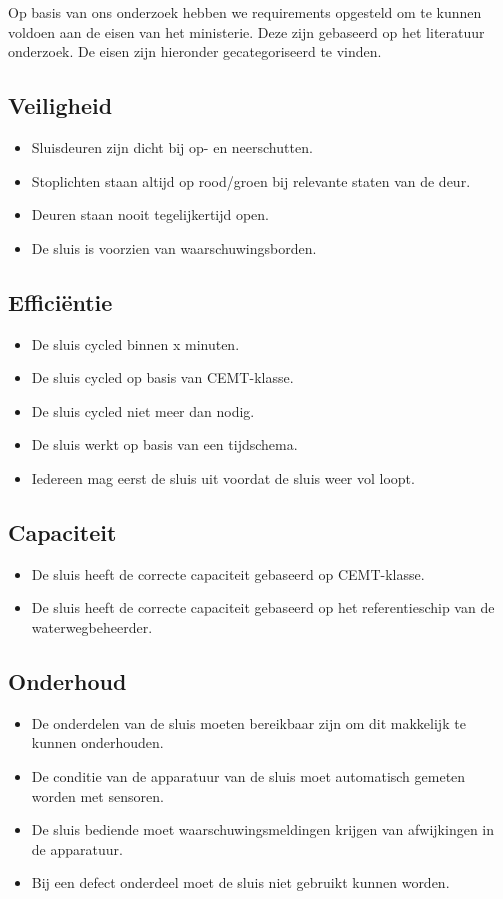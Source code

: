 \documentclass[../verslag.tex]{subfiles}
\begin{document}
Op basis van ons onderzoek hebben we requirements opgesteld om te kunnen voldoen aan de eisen van het ministerie. Deze zijn gebaseerd op het literatuur onderzoek. De eisen zijn hieronder gecategoriseerd te vinden.

\subsection{Veiligheid}
\begin{itemize}
    \item Sluisdeuren zijn dicht bij op- en neerschutten.
    \item Stoplichten staan altijd op rood/groen bij relevante staten van de deur.
    \item Deuren staan nooit tegelijkertijd open.
    \item De sluis is voorzien van waarschuwingsborden.
\end{itemize}

\subsection{Efficiëntie}
\begin{itemize}
    \item De sluis cycled binnen x minuten.
    \item De sluis cycled op basis van CEMT-klasse.
    \item De sluis cycled niet meer dan nodig.
    \item De sluis werkt op basis van een tijdschema.
    \item Iedereen mag eerst de sluis uit voordat de sluis weer vol loopt.
\end{itemize}

\subsection{Capaciteit}
\begin{itemize}
    \item De sluis heeft de correcte capaciteit gebaseerd op CEMT-klasse.
    \item De sluis heeft de correcte capaciteit gebaseerd op het referentieschip van de waterwegbeheerder.
\end{itemize}

\subsection{Onderhoud}
\begin{itemize}
    \item De onderdelen van de sluis moeten bereikbaar zijn om dit makkelijk te kunnen onderhouden.
    \item De conditie van de apparatuur van de sluis moet automatisch gemeten worden met sensoren.
    \item De sluis bediende moet waarschuwingsmeldingen krijgen van afwijkingen in de apparatuur.
    \item Bij een defect onderdeel moet de sluis niet gebruikt kunnen worden.
\end{itemize}
\end{document}

